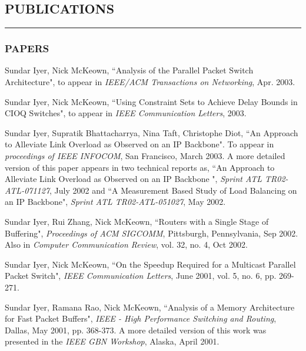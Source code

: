 \documentclass[10pt,a4]{article}
\newcounter{myEnumCounter}
\newcounter{mySaveCounter}
\renewenvironment{enumerate}{%
  \begin{list}{\arabic{myEnumCounter}.}{\usecounter{myEnumCounter}%
  \setcounter{myEnumCounter}{\value{mySaveCounter}}}
  }{%
  \setcounter{mySaveCounter}{\value{myEnumCounter}}\end{list}%
}
\begin{document}
\begin{small}
\begin{itemize}
\end{itemize}


\subsection*{PUBLICATIONS}
\hrule
\vspace{0.2cm}

\subsubsection*{PAPERS}

\begin{enumerate}
    \item 
Sundar Iyer, Nick McKeown,
``Analysis of the Parallel Packet Switch Architecture",
to appear in {\it IEEE/ACM Transactions on Networking}, Apr. 2003.

    \item 
Sundar Iyer, Nick McKeown,
``Using Constraint Sets to Achieve Delay Bounds in CIOQ Switches", 
to appear in {\it IEEE Communication Letters}, 2003.

    \item 
Sundar Iyer, Supratik Bhattacharrya, Nina Taft, Christophe Diot,
``An Approach to Alleviate Link Overload as Observed on an IP Backbone". To appear in
{\it proceedings of IEEE INFOCOM}, San Francisco, March 2003. A more detailed
version of this paper appears in two technical reports as, ``An Approach to
Alleviate Link Overload as Observed on an IP Backbone ", {\it Sprint ATL
TR02-ATL-071127}, July 2002 and ``A Measurement Based Study of Load Balancing on an IP Backbone", {\it Sprint ATL TR02-ATL-051027}, May 2002.


    \item 
Sundar Iyer, Rui Zhang, Nick McKeown,
``Routers with a Single Stage of Buffering", 
{\it Proceedings of ACM SIGCOMM}, Pittsburgh, Pennsylvania, Sep 2002. Also in
{\it Computer Communication Review}, vol. 32, no. 4, Oct 2002.


    \item 
Sundar Iyer, Nick McKeown,
``On the Speedup Required for a Multicast Parallel Packet Switch", 
{\it IEEE Communication Letters}, June 2001, vol. 5, no. 6, pp. 269-271.

    \item 
Sundar Iyer, Ramana  Rao, Nick McKeown,
``Analysis of a Memory Architecture for Fast Packet Buffers", 
{\it IEEE - High Performance Switching and Routing}, Dallas, May 2001, pp.
368-373. A more detailed version of this work was presented in the {\it IEEE GBN
Workshop}, Alaska, April 2001.


\end{enumerate}
\end{small}
\end{document}
